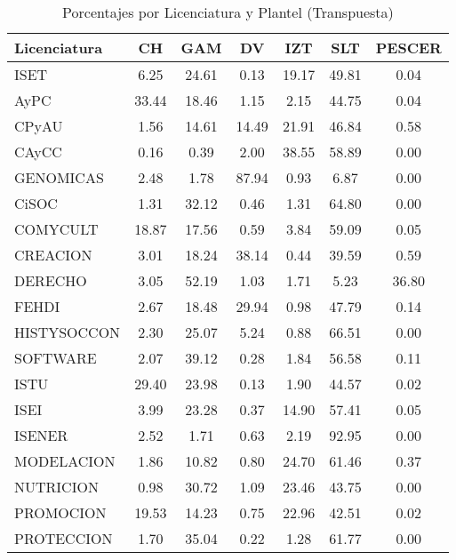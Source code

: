 \documentclass{article}
\begin{document}
\begin{table}[ht]
\centering
\caption{Porcentajes por Licenciatura y Plantel (Transpuesta)}
\label{tab:porcentajes_transpuesta}
\begin{tabular}{|l|c|c|c|c|c|c|}
\hline
Licenciatura & CH & GAM & DV & IZT & SLT & PESCER \\ \hline
ISET & 6.25 & 24.61 & 0.13 & 19.17 & 49.81 & 0.04 \\
AyPC & 33.44 & 18.46 & 1.15 & 2.15 & 44.75 & 0.04 \\
CPyAU & 1.56 & 14.61 & 14.49 & 21.91 & 46.84 & 0.58 \\
CAyCC & 0.16 & 0.39 & 2.00 & 38.55 & 58.89 & 0.00 \\
GENOMICAS & 2.48 & 1.78 & 87.94 & 0.93 & 6.87 & 0.00 \\
CiSOC & 1.31 & 32.12 & 0.46 & 1.31 & 64.80 & 0.00 \\
COMYCULT & 18.87 & 17.56 & 0.59 & 3.84 & 59.09 & 0.05 \\
CREACION & 3.01 & 18.24 & 38.14 & 0.44 & 39.59 & 0.59 \\
DERECHO & 3.05 & 52.19 & 1.03 & 1.71 & 5.23 & 36.80 \\
FEHDI & 2.67 & 18.48 & 29.94 & 0.98 & 47.79 & 0.14 \\
HISTYSOCCON & 2.30 & 25.07 & 5.24 & 0.88 & 66.51 & 0.00 \\
SOFTWARE & 2.07 & 39.12 & 0.28 & 1.84 & 56.58 & 0.11 \\
ISTU & 29.40 & 23.98 & 0.13 & 1.90 & 44.57 & 0.02 \\
ISEI & 3.99 & 23.28 & 0.37 & 14.90 & 57.41 & 0.05 \\
ISENER & 2.52 & 1.71 & 0.63 & 2.19 & 92.95 & 0.00 \\
MODELACION & 1.86 & 10.82 & 0.80 & 24.70 & 61.46 & 0.37 \\
NUTRICION & 0.98 & 30.72 & 1.09 & 23.46 & 43.75 & 0.00 \\
PROMOCION & 19.53 & 14.23 & 0.75 & 22.96 & 42.51 & 0.02 \\
PROTECCION & 1.70 & 35.04 & 0.22 & 1.28 & 61.77 & 0.00 \\
\hline
\end{tabular}
\end{table}
\end{document}
